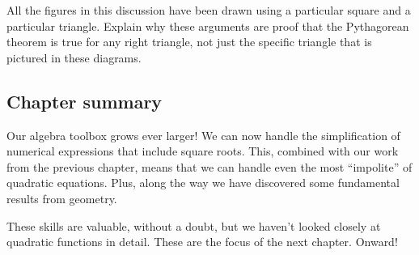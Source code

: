 All the figures in this discussion have been drawn using a particular square and a particular triangle. Explain why these arguments are proof that the Pythagorean theorem is true for any right triangle, not just the specific triangle that is pictured in these diagrams.


\subsection*{Chapter summary}

Our algebra toolbox grows ever larger! We can now handle the simplification of numerical expressions that include square roots. This, combined with our work from the previous chapter, means that we can handle even the most ``impolite'' of quadratic equations. Plus, along the way we have discovered some fundamental results from geometry.

These skills are valuable, without a doubt, but we haven't looked closely at quadratic functions in detail. These are the focus of the next chapter. Onward!

